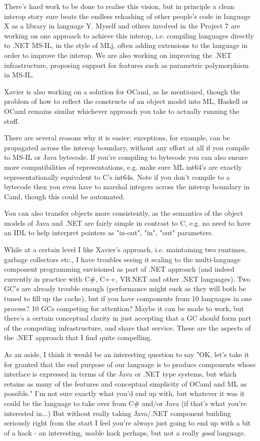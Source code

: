 \documentclass[acmsmall]{acmart}\settopmatter{}
\begin{document}
\begin{verbquote}
There's hard work to be done to realise this vision, but in principle a clean interop story sure beats the endless rehashing of other people's code in language X as a library in language Y.  Myself and others involved in the Project 7 are working on one approach to achieve this interop, i.e. compiling languages directly to .NET MS-IL, in the style of MLj, often adding extensions to the language in order to improve the interop.  We are also working on improving the .NET infrastructure, proposing support for features such as parametric polymorphism in MS-IL.  

Xavier is also working on a solution for OCaml, as he mentioned, though the problem of how to reflect the constructs of an object model into ML, Haskell or OCaml remains similar whichever approach you take to actually running the stuff.

There are several reasons why it is easier: exceptions, for example, can be propagated across the interop boundary, without any effort at all if you compile to MS-IL or Java bytecode.  If you're compiling to bytecode you can also ensure more compatibilities of representations, e.g. make sure ML int64's are exactly representationally equivalent to C's int64s.  Note if you don't compile to a bytecode then you even have to marshal integers across the interop boundary in Caml, though this could be automated.

You can also transfer objects more consistently, as the semantics of the object models of Java and .NET are fairly simple in contrast to C, e.g. no need to have an IDL to help interpret pointers as "in-out", "in", "out" parameters.

While at a certain level I like Xavier's approach, i.e. maintaining two runtimes, garbage collectors etc., I have troubles seeing it scaling to the multi-language component programming envisioned as part of .NET approach (and indeed currently in practice with C\#, C++, VB.NET and other .NET languages).  Two GC's are already trouble enough (performance might suck as they will both be tuned to fill up the cache), but if you have components from 10 languages in one process?  10 GCs competing for attention?  Maybe it can be made to work, but there's a certain conceptual clarity in just accepting that a GC should form part of the computing infrastructure, and share that service.  These are the aspects of the .NET approach that I find quite compelling.

As an aside, I think it would be an interesting question to say "OK, let's take it for granted that the end purpose of our language is to produce components whose interface is expressed in terms of the Java or .NET type systems, but which retains as many of the features and conceptual simplicity of OCaml and ML as possible."  I'm not sure exactly what you'd end up with, but whatever it was it could be the language to take over from C\# and/or Java (if that's what you're interested in...)  But without really taking Java/.NET component building seriously right from the start I feel you're always just going to end up with a bit of a hack - an interesting, usable hack perhaps, but not a really \emph{good} language.


\end{verbquote}
\end{document}
